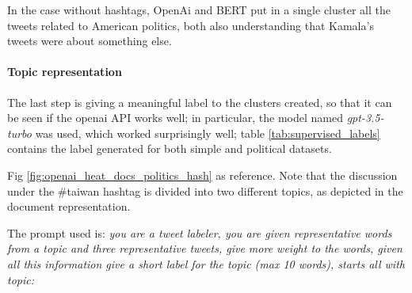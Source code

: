 In the case without hashtags, OpenAi and BERT put in a single cluster all the tweets related to American politics, both also understanding that Kamala's tweets were about something else.


\paragraph{Topic representation}
The last step is giving a meaningful label to the clusters created, so that it can be seen if the openai API works well; in particular, the model named \textit{gpt-3.5-turbo} was used, which worked surprisingly well; table \ref{tab:supervised_labels} contains the label generated for both simple and political datasets.

Fig \ref{fig:openai_heat_docs_politics_hash} as reference. Note that the discussion under the \#taiwan hashtag is divided into two different topics, as depicted in the document representation.

The prompt used is: \textit{you are a tweet labeler, you are given representative words from a topic and three representative tweets, give more weight to the words, given all this information give a short label for the topic (max 10 words), starts all with topic:}


